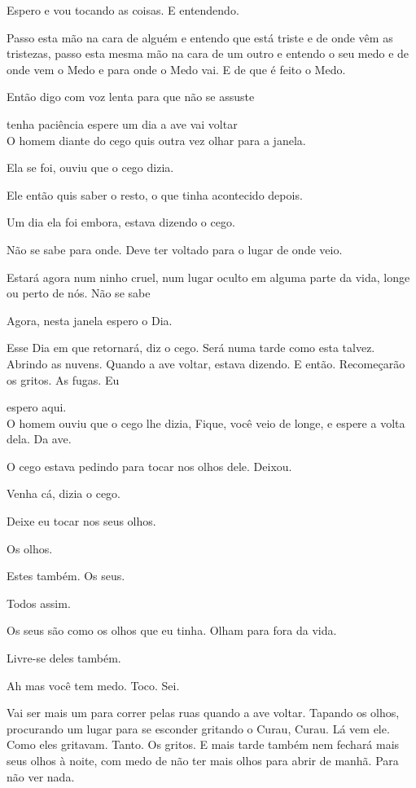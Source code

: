 Espero e vou tocando as coisas. E entendendo.

Passo esta mão na cara de alguém e entendo que está triste e de onde vêm
as tristezas, passo esta mesma mão na cara de um outro e entendo o seu
medo e de onde vem o Medo e para onde o Medo vai. E de que é feito o
Medo.

Então digo com voz lenta para que não se assuste

tenha paciência espere um dia a ave vai voltar\\

O homem diante do cego quis outra vez olhar para a janela.

Ela se foi, ouviu que o cego dizia.

Ele então quis saber o resto, o que tinha acontecido depois.

Um dia ela foi embora, estava dizendo o cego.

Não se sabe para onde. Deve ter voltado para o lugar de onde veio.

Estará agora num ninho cruel, num lugar oculto em alguma parte da vida,
longe ou perto de nós. Não se sabe

Agora, nesta janela espero o Dia.

Esse Dia em que retornará, diz o cego. Será numa tarde como esta talvez.
Abrindo as nuvens. Quando a ave voltar, estava dizendo. E então.
Recomeçarão os gritos. As fugas. Eu

espero aqui.\\

O homem ouviu que o cego lhe dizia, Fique, você veio de longe, e espere
a volta dela. Da ave.

O cego estava pedindo para tocar nos olhos dele. Deixou.

Venha cá, dizia o cego.

Deixe eu tocar nos seus olhos.

Os olhos.

Estes também. Os seus.

Todos assim.

Os seus são como os olhos que eu tinha. Olham para fora da vida.

Livre-se deles também.

Ah mas você tem medo. Toco. Sei.

Vai ser mais um para correr pelas ruas quando a ave voltar. Tapando os
olhos, procurando um lugar para se esconder gritando o Curau, Curau. Lá
vem ele. Como eles gritavam. Tanto. Os gritos. E mais tarde também nem
fechará mais seus olhos à noite, com medo de não ter mais olhos para
abrir de manhã. Para não ver nada.\\

